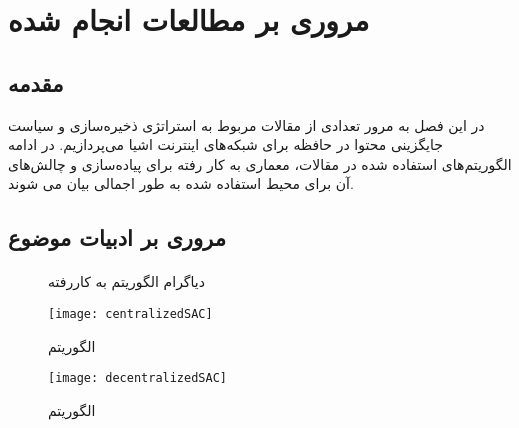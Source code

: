 \chapter{مروری بر مطالعات انجام شده}
\section{مقدمه}
در این فصل به مرور تعدادی از مقالات مربوط به استراتژی ذخیره‌سازی و سیاست جایگزینی محتوا در حافظه برای شبکه‌های اینترنت اشیا می‌پردازیم. در ادامه الگوریتم‌های استفاده شده در مقالات، معماری به کار رفته برای پیاده‌سازی و چالش‌های آن برای محیط  استفاده شده به طور اجمالی بیان می شوند. 

\section{مروری بر ادبیات موضوع}

\subsubsection{}
	

\begin{figure}[ht]
	\centering 
	\hspace{2mm}
	\caption{دیاگرام الگوریتم  به کاررفته}
	\label{fig:centralizedvsdec} %
\end{figure}

\begin{figure}[ht]
	\centerline{\texttt{[image: centralizedSAC]}}
	\caption{الگوریتم }
	\label{fig:cSACAlgo}
\end{figure}

\begin{figure}[ht]
	\centerline{\texttt{[image: decentralizedSAC]}}
	\caption{الگوریتم }
	\label{fig:dSACAlgo}
\end{figure}

\subsubsection{}


